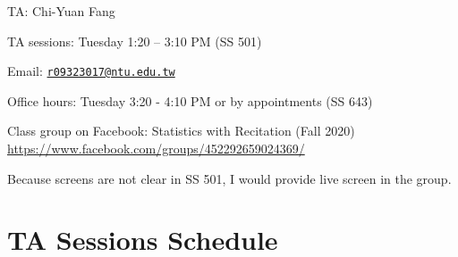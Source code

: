 \documentclass[
]{book}
\begin{document}
TA: Chi-Yuan Fang

TA sessions: Tuesday 1:20 -- 3:10 PM (SS 501)

Email: \href{mailto:r09323017@ntu.edu.tw}{\nolinkurl{r09323017@ntu.edu.tw}}

Office hours: Tuesday 3:20 - 4:10 PM or by appointments (SS 643)

Class group on Facebook: Statistics with Recitation (Fall 2020) \url{https://www.facebook.com/groups/452292659024369/}

Because screens are not clear in SS 501, I would provide live screen in the group.

\hypertarget{ta-sessions-schedule}{%
\section{TA Sessions Schedule}\label{ta-sessions-schedule}}
\end{document}
